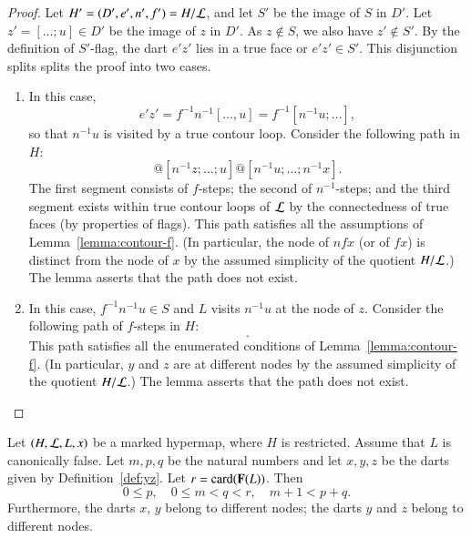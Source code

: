 \begin{proof}
Let $H' = (D',e',n',f') = H/{\cal L}$, and let $S'$ be the image of $S$ in $D'$.
Let $z' = [\ldots;u]\in D'$ be the
image of $z$ in $D'$.    
As $z\not\in S$, we also have $z'\not\in S'$.
By the definition of
$S'$-flag, the dart $e'z'$ lies in a true face or $e'z'\in S'$.  
This disjunction splits
splits the proof into two cases.
\begin{enumerate}
\item{}  In this case, 
\begin{displaymath}
e'z' = f^{-1} n^{-1} [\ldots,u] = f^{-1} [n^{-1}u;\ldots],
\end{displaymath}
so that $n^{-1} u$ is visited by a true contour loop.
Consider the following
path in $H$:
\begin{displaymath}
[y;fy;\ldots;z] @ [n^{-1}z;\ldots;u] @ [n^{-1} u;\ldots;n^{-1} x].
\end{displaymath}
The first segment consists of $f$-steps; the second of $n^{-1}$-steps;
and the third segment exists within true contour loops of ${\cal L}$
by the connectedness of true faces (by properties of flags).  This
path satisfies all the assumptions of Lemma~\ref{lemma:contour-f}.  (In particular,
the node of $n f x$ (or of $f x$)  is distinct from the node of $x$ by the
assumed simplicity of the quotient $H/{\cal L}$.)
The lemma asserts that the path does not exist.
\item 
\claim {[$e'z'\in S$.]}  In this case,  
$f^{-1}n^{-1}u \in S$ and $L$ visits $n^{-1} u$ at the node of $z$.
Consider the following path of $f$-steps in $H$:
\begin{displaymath}
[y;f y;\ldots;z].
\end{displaymath}
This path satisfies all the enumerated conditions of
Lemma~\ref{lemma:contour-f}.  (In particular, $y$ and $z$ are at
different nodes by the assumed simplicity of the quotient $H/{\cal
  L}$.)  The lemma asserts that the path does not exist.
\end{enumerate}
\end{proof}

\begin{lemma}[parameters]\label{lemma:parameters}
Let $(H,{\cal L},L,x)$ be a
marked hypermap, where $H$ is restricted. Assume that $L$ is canonically false.
Let $m,p,q$ be the natural numbers and let $x,y,z$ be the darts given by
Definition~\ref{def:yz}.  Let $r = {\operatorname{card}}({\mathbf F}(L))$.  Then
\begin{displaymath}
0\le p,\quad 0\le m < q < r,\quad m+1 < p+q.
\end{displaymath}
Furthermore, the darts $x$, $y$ belong to different nodes; the darts
$y$ and $z$ belong to different nodes.
\end{lemma}

